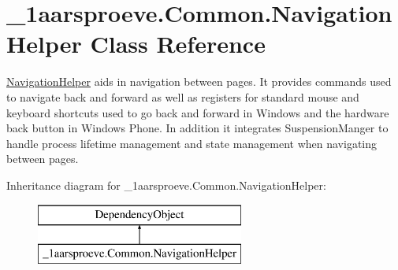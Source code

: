 \hypertarget{class__1aarsproeve_1_1_common_1_1_navigation_helper}{}\section{\+\_\+1aarsproeve.\+Common.\+Navigation\+Helper Class Reference}
\label{class__1aarsproeve_1_1_common_1_1_navigation_helper}


\hyperlink{class__1aarsproeve_1_1_common_1_1_navigation_helper}{Navigation\+Helper} aids in navigation between pages. It provides commands used to navigate back and forward as well as registers for standard mouse and keyboard shortcuts used to go back and forward in Windows and the hardware back button in Windows Phone. In addition it integrates Suspension\+Manger to handle process lifetime management and state management when navigating between pages.  


Inheritance diagram for \+\_\+1aarsproeve.\+Common.\+Navigation\+Helper\+:\begin{figure}[H]
\begin{center}
\leavevmode
\includegraphics[height=2.000000cm]{class__1aarsproeve_1_1_common_1_1_navigation_helper}
\end{center}
\end{figure}
